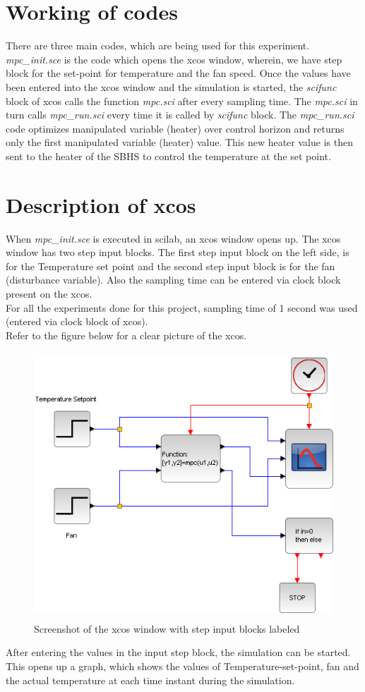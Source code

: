 \section{Working of codes}
There are three main codes, which are being used for this experiment. \emph{mpc\_init.sce} is the code which opens the xcos window, wherein, we have step block for the set-point for temperature and the fan speed. Once the values have been entered into the xcos window and the simulation is started, the \emph{scifunc} block of xcos calls the function \emph{mpc.sci} after every sampling time. The \emph{mpc.sci} in turn calls \emph{mpc\_run.sci} every time it is called by  \emph{scifunc} block. The \emph{mpc\_run.sci} code optimizes manipulated variable (heater) over control horizon and returns only the first manipulated variable (heater) value. This new heater value is then sent to the heater of the SBHS to control the temperature at the set point.
\section{Description of xcos}
When \emph{mpc\_init.sce} is executed in scilab, an xcos window opens up. The xcos window has two step input blocks. The first step input block on the left side, is for the Temperature set point and the second step input block is for the fan (disturbance variable). Also the sampling time can be entered via clock block present on the xcos. \\
For all the experiments done for this project, sampling time of 1 second was used (entered via clock block of xcos). \\
Refer to the figure below for a clear picture of the xcos.
\begin{figure}[H]
\centering
  \includegraphics[width=12cm, height=10cm]{mpc/mpc_xcos.png}
  \caption{Screenshot of the xcos window with step input blocks labeled}
\end{figure}
After entering the values in the input step block, the simulation can be started. This opens up a graph, which shows the values of Temperature-set-point, fan and the actual temperature at each time instant during the simulation.


